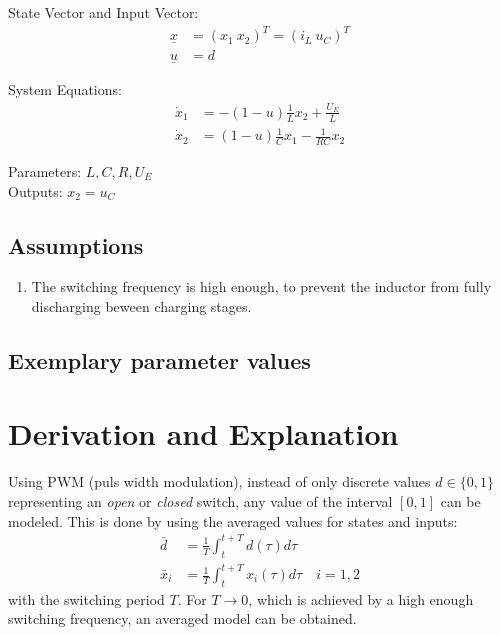 \documentclass[10pt,a4paper]{article}
\begin{document}
	State Vector and Input Vector:
	\begin{align*}
		\underline{x} &= (x_1 \ x_2)^T = (i_L \ u_C)^T \\
		\underline{u} &= d
	\end{align*}
	
	\noindent System Equations:			
	\begin{subequations}
	\begin{align}
		\dot{x}_1 &= -(1-u)\frac{1}{L}x_2 + \frac{U_E}{L} \\
		\dot{x}_2 &= (1-u)\frac{1}{C}x_1 - \frac{1}{RC}x_2
	\end{align}
	\end{subequations}

	\noindent
	Parameters: $L, C, R, U_E$ %
	\\
	Outputs: $x_2 = u_C$
	
	
	\subsection{Assumptions} %
		\begin{enumerate} %
			\item The switching frequency is high enough, to prevent the inductor from fully discharging beween charging stages.
		\end{enumerate}
	
	
	\subsection{Exemplary parameter values}
	

	
	\section{Derivation and Explanation} %
	Using PWM (puls width modulation), instead of only discrete values $d\in\{0,1\}$ representing an \textit{open} or \textit{closed} switch, 
	any value of the interval $[0,1]$ can be modeled. This is done by using the averaged values for states and inputs:
	\begin{align*}
		\bar{d} &= \frac{1}{T}\int_t^{t+T} d(\tau)d\tau \\
		\bar{x}_i &= \frac{1}{T}\int_t^{t+T} x_i(\tau)d\tau \quad i=1,2
	\end{align*}
	with the switching period $T$. For $T\rightarrow 0$, which is achieved by a high enough switching frequency, an averaged model can be obtained.
	
\end{document}
